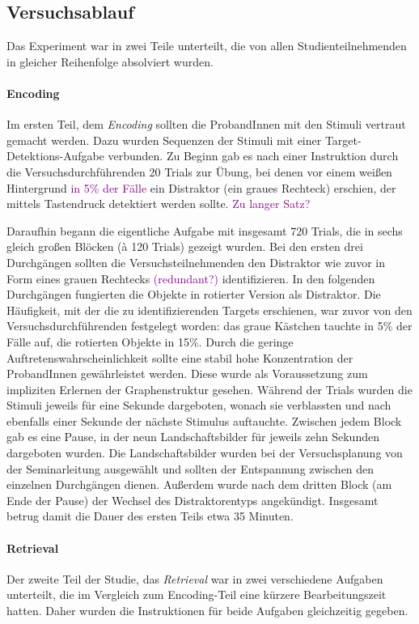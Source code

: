 \subsection{Versuchsablauf}
Das Experiment war in zwei Teile unterteilt, die von allen Studienteilnehmenden in gleicher Reihenfolge absolviert wurden.

\paragraph{Encoding} Im ersten Teil, dem \textit{Encoding} sollten die ProbandInnen mit den Stimuli vertraut gemacht werden. Dazu wurden Sequenzen der Stimuli mit einer Target-Detektions-Aufgabe verbunden. Zu Beginn gab es nach einer Instruktion durch die Versuchsdurchführenden 20 Trials zur Übung, bei denen vor einem weißen Hintergrund \textcolor{purple}{in 5\% der Fälle} ein Distraktor (ein graues Rechteck) erschien, der mittels Tastendruck detektiert werden sollte. \textcolor{purple}{Zu langer Satz?}

Daraufhin begann die eigentliche Aufgabe mit insgesamt 720 Trials, die in sechs gleich großen Blöcken (à 120 Trials) gezeigt wurden. Bei den ersten drei Durchgängen sollten die Versuchsteilnehmenden den Distraktor wie zuvor in Form eines grauen Rechtecks \textcolor{purple}{(redundant?)} identifizieren. In den folgenden Durchgängen fungierten die Objekte in rotierter Version als Distraktor. Die Häufigkeit, mit der die zu identifizierenden Targets erschienen, war zuvor von den Versuchsdurchführenden festgelegt worden: das graue Kästchen tauchte in 5\% der Fälle auf, die rotierten Objekte in 15\%. Durch die geringe Auftretenswahrscheinlichkeit sollte eine stabil hohe Konzentration der ProbandInnen gewährleistet werden. Diese wurde als Voraussetzung zum impliziten Erlernen der Graphenstruktur gesehen.
Während der Trials wurden die Stimuli jeweils für eine Sekunde dargeboten, wonach sie verblassten und nach ebenfalls einer Sekunde der nächste Stimulus auftauchte. Zwischen jedem Block gab es eine Pause, in der neun Landschaftsbilder für jeweils zehn Sekunden dargeboten wurden. Die Landschaftsbilder wurden bei der Versuchsplanung von der Seminarleitung ausgewählt und sollten der Entspannung zwischen den einzelnen Durchgängen dienen. Außerdem wurde nach dem dritten Block (am Ende der Pause) der Wechsel des Distraktorentyps angekündigt. Insgesamt betrug damit die Dauer des ersten Teils etwa 35 Minuten.

\paragraph{Retrieval} Der zweite Teil der Studie, das \textit{Retrieval} war in zwei verschiedene Aufgaben unterteilt, die im Vergleich zum Encoding-Teil eine kürzere Bearbeitungszeit hatten. Daher wurden die Instruktionen für beide Aufgaben gleichzeitig gegeben.


